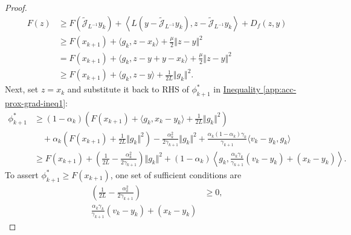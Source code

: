 \documentclass[12pt]{article}
\begin{document}
\begin{proof}
        \begin{align*}
            F(z) &\ge 
            F\left(\widetilde{\mathcal J}_{L^{-1}}y_k\right)
            + \left\langle 
                L(y - \widetilde{\mathcal J}_{L^{-1}}y_k), 
                z - \widetilde{\mathcal J}_{L^{-1}}y_k
            \right\rangle + D_f(z, y)
            \\
            &\ge 
            F(x_{k + 1}) + \langle g_k, z - x_k\rangle + \frac{\mu}{2}\Vert z - y\Vert^2
            \\
            &=
            F(x_{k + 1}) + \langle g_k, z - y + y - x_k\rangle + \frac{\mu}{2}\Vert z - y\Vert^2
            \\
            &\ge
            F(x_{k + 1}) + \langle g_k, z - y\rangle 
            + \frac{1}{2L}\Vert g_k\Vert^2. 
        \end{align*}
        Next, set $z = x_{k}$ and substitute it back to RHS of $\phi_{k + 1}^*$ in 
        \hyperref[app:acc-prox-grad-ineq1]{Inequality \ref*{app:acc-prox-grad-ineq1}}: 
        \begin{align*}
            \phi_{k + 1}^*
            &\ge 
            (1 - \alpha_k)
            \left(
                F(x_{k + 1}) + \langle g_k, x_k - y_k\rangle + \frac{1}{2L}\Vert g_k\Vert^2
            \right)
            \\
            &\quad 
            + 
            \alpha_k
            \left(
                F(x_{k + 1}) + \frac{1}{2L}\Vert g_k\Vert^2
            \right)
            - \frac{\alpha_k^2}{2\gamma_{k + 1}}\Vert g_k\Vert^2
            + 
            \frac{\alpha_k (1 - \alpha_k)\gamma_k}{\gamma_{k + 1}}
            \langle v_k - y_k, g_k\rangle
            \\
            &\ge 
            F(x_{k + 1})
            + 
            \left(
                \frac{1}{2L} - \frac{\alpha_k^2}{2\gamma_{k + 1}}
            \right)\Vert g_k\Vert^2
            + 
            (1 - \alpha_k)
            \left\langle 
                g_k, \frac{\alpha_k\gamma_k}{\gamma_{k + 1}}(v_k - y_k) + (x_k - y_k)
            \right\rangle. 
        \end{align*}
        To assert $\phi_{k + 1}^* \ge F(x_{k + 1})$, one set of sufficient conditions are 
        \begin{align*}
            \left(
                \frac{1}{2L} - \frac{\alpha_k^2}{2\gamma_{k + 1}}
            \right) &\ge 0, 
            \\
            \frac{\alpha_k\gamma_k}{\gamma_{k + 1}}(v_k - y_k) + (x_k - y_k) 

\end{align*}
\end{proof}
\end{document}
